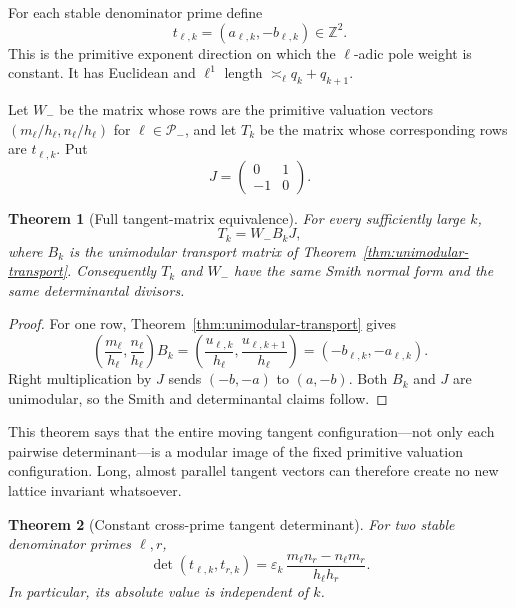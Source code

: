 \documentclass[11pt,oneside]{article}
\newtheorem{theorem}{Theorem}[section]
\theoremstyle{definition}
\theoremstyle{remark}
\newcommand{\Z}{\mathbb Z}
\newcommand{\eps}{\varepsilon}
\begin{document}
For each stable denominator prime define
\begin{equation}
 t_{\ell,k}=(a_{\ell,k},-b_{\ell,k})\in\Z^2.
 \label{eq:tangent-vector}
\end{equation}
This is the primitive exponent direction on which the $\ell$-adic pole weight is constant.
It has Euclidean and $\ell^1$ length $\asymp_\ell q_k+q_{k+1}$.

Let $W_-$ be the matrix whose rows are the primitive valuation vectors
$(m_\ell/h_\ell,n_\ell/h_\ell)$ for $\ell\in\mathcal P_-$, and let $T_k$ be the matrix whose
corresponding rows are $t_{\ell,k}$.  Put
\[
 J=\begin{pmatrix}0&1\\-1&0\end{pmatrix}.
\]

\begin{theorem}[Full tangent-matrix equivalence]
\label{thm:tangent-matrix-equivalence}
For every sufficiently large $k$,
\begin{equation}
 T_k=W_-B_kJ,
 \label{eq:tangent-matrix-equivalence}
\end{equation}
where $B_k$ is the unimodular transport matrix of
Theorem~\ref{thm:unimodular-transport}.  Consequently $T_k$ and $W_-$ have the same Smith
normal form and the same determinantal divisors.
\end{theorem}

\begin{proof}
For one row, Theorem~\ref{thm:unimodular-transport} gives
\[
 \left(\frac{m_\ell}{h_\ell},\frac{n_\ell}{h_\ell}\right)B_k
 =\left(\frac{u_{\ell,k}}{h_\ell},\frac{u_{\ell,k+1}}{h_\ell}\right)
 =(-b_{\ell,k},-a_{\ell,k}).
\]
Right multiplication by $J$ sends $(-b,-a)$ to $(a,-b)$.  Both $B_k$ and $J$ are
unimodular, so the Smith and determinantal claims follow.
\end{proof}

This theorem says that the entire moving tangent configuration---not only each pairwise
determinant---is a modular image of the fixed primitive valuation configuration.  Long,
almost parallel tangent vectors can therefore create no new lattice invariant whatsoever.

\begin{theorem}[Constant cross-prime tangent determinant]
\label{thm:tangent-determinant}
For two stable denominator primes $\ell,r$,
\begin{equation}
 \det(t_{\ell,k},t_{r,k})
 =\eps_k\,
 \frac{m_\ell n_r-n_\ell m_r}{h_\ell h_r}.
 \label{eq:tangent-determinant}
\end{equation}
In particular, its absolute value is independent of $k$.
\end{theorem}
\end{document}
